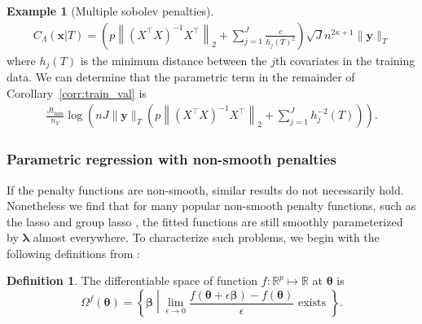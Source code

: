 \documentclass[12pt]{article} %
\theoremstyle{definition}
\newtheorem{definition}{Definition}
\newtheorem{example}{Example}
\begin{document}
\begin{example}[Multiple sobolev penalties]
\begin{align}
	C_\Lambda(\boldsymbol{x} | T)
	=
	\left(
	p
	\left \|
	\left(
	X^\top X
	\right)^{-1}
	X^\top
	\right \|_2
	+
	\sum_{j=1}^J \frac{c }{h_j(T)^2}
	\right)
	\sqrt{J}
	n^{2\kappa + 1}
	\|\boldsymbol{y}\|_T
	\label{eq:sobolev_lipschitz}
	\end{align}
	where $h_j(T)$ is the minimum distance between the $j$th covariates in the training data.
	We can determine that the parametric term in the remainder of Corollary~\ref{corr:train_val} is
	\begin{align}
	\frac{J t_{\min}}{n_{V}} \log \left (
	n
	J
	\|\boldsymbol{y}\|_T
	\left(
	p
	\left \|
	\left(
	X^\top X
	\right)^{-1}
	X^\top
	\right \|_2
	+
	\sum_{j=1}^J h_j^{-2}(T)
	\right)
	\right ).
	\label{eq:sobolev_param}
	\end{align}
\end{example}

\subsubsection{Parametric regression with non-smooth penalties}
\label{sec:param_nonsmooth}

If the penalty functions are non-smooth, similar results do not necessarily hold. Nonetheless we find that for many popular non-smooth penalty functions, such as the lasso \citep{tibshirani1996regression} and group lasso \citep{yuan2006model}, the fitted functions are still smoothly parameterized by $\boldsymbol \lambda$ almost everywhere.
To characterize such problems, we begin with the following definitions from \citet{feng2017gradient}:

\begin{definition}
	The differentiable space of function $f:\mathbb{R}^p \mapsto \mathbb{R}$ at $\boldsymbol{\theta}$ is
	\begin{equation}
	\Omega^{f}(\boldsymbol{\theta}) = \left \{ \boldsymbol{\beta} \middle | \lim_{\epsilon \rightarrow 0} \frac{f(\boldsymbol{\theta} + \epsilon \boldsymbol{\beta}) - f(\boldsymbol{\theta})}{\epsilon} \text{ exists } \right \}.
	\end{equation}
\end{definition}
\end{document}
